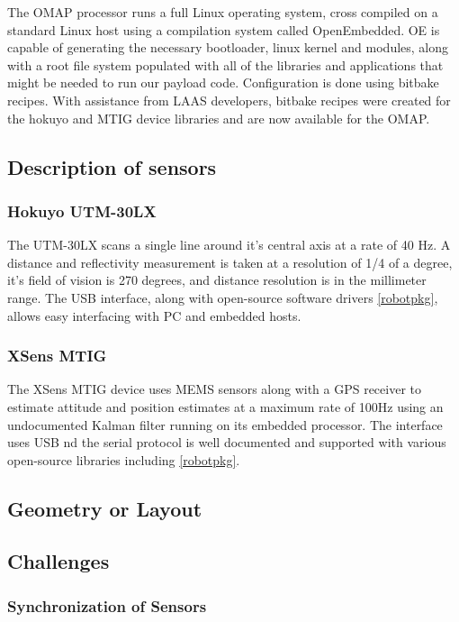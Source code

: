 \documentclass[a4paper,11pt]{report}
\begin{document}
The OMAP processor runs a full Linux operating system, cross compiled on a standard Linux host using a compilation system called OpenEmbedded. OE is capable of generating the necessary bootloader, linux kernel and modules, along with a root file system populated with all of the libraries and applications that might be needed to run our payload code. Configuration is done using bitbake recipes. With assistance from LAAS developers, bitbake recipes were created for the hokuyo and MTIG device libraries and are now available for the OMAP.

\subsection{Description of sensors}

\subsubsection{Hokuyo UTM-30LX}

The UTM-30LX scans a single line around it's central axis at a rate of 40 Hz. A distance and reflectivity measurement is taken at a resolution of 1/4 of a degree, it's field of vision is 270 degrees, and distance resolution is in the millimeter range. The USB interface, along with open-source software drivers \ref{robotpkg}, allows easy interfacing with PC and embedded hosts.

\subsubsection{XSens MTIG}

The XSens MTIG device uses MEMS sensors along with a GPS receiver to estimate attitude and position estimates at a maximum rate of 100Hz using an undocumented Kalman filter running on its embedded processor. The interface uses USB nd the serial protocol is well documented and supported with various open-source libraries including \ref{robotpkg}.

\subsection{Geometry or Layout}



\subsection{Challenges}


\subsubsection{Synchronization of Sensors}
 
\end{document}
